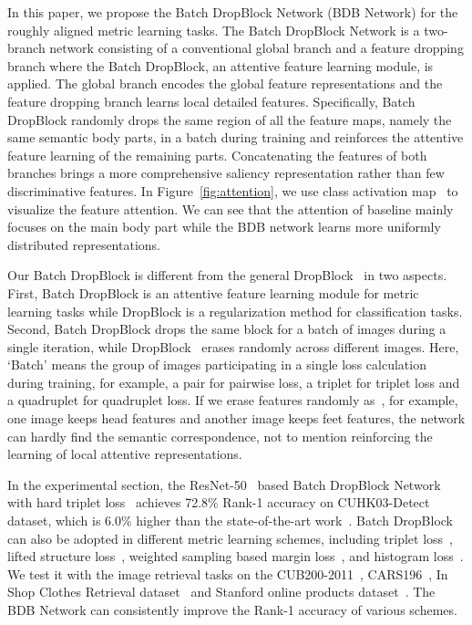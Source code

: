 \documentclass[10pt,twocolumn,letterpaper]{article}
\begin{document}
In this paper, we propose the Batch DropBlock Network (BDB Network) for the roughly aligned metric learning tasks. 
The Batch DropBlock Network is a two-branch network \textcolor{myRed}{consisting} of a conventional global branch and a feature dropping branch where the Batch DropBlock, an attentive feature learning module, is applied. The global branch encodes the global feature representations and the feature dropping branch learns local detailed features.
Specifically, Batch DropBlock randomly drops the same region of all the feature maps, namely the same semantic body parts, in a batch during training and reinforces the attentive feature learning of the \textcolor{myRed}{remaining} parts.
Concatenating the features of both branches brings a more comprehensive saliency representation rather than few discriminative features.
In Figure~\ref{fig:attention}, we use class activation map~\cite{zhou2016learning} to visualize the feature attention. We can see that the attention of baseline mainly focuses on the main body part while the BDB network learns more uniformly distributed representations.

Our Batch DropBlock is different from the general DropBlock~\cite{ghiasi2018dropblock} in two aspects.
First, Batch DropBlock is an attentive feature learning module for metric learning tasks while DropBlock is a regularization method for classification tasks.
Second, Batch DropBlock drops the same block for a batch of images during a single iteration, while DropBlock~\cite{ghiasi2018dropblock} erases randomly across different images. 
Here, `Batch' means the group of images participating in a single loss calculation during training, for example, a pair for pairwise loss, a triplet for triplet loss and a quadruplet for quadruplet loss.
If we erase features randomly as~\cite{ghiasi2018dropblock}, for example, one image keeps head features and another image keeps feet features, the network can hardly find the semantic correspondence, not to mention reinforcing the learning of local attentive representations.


In the experimental section, the ResNet-50~\cite{he2016resnet} based Batch DropBlock Network with hard triplet loss~\cite{hermans2017defense} achieves 72.8\% Rank-1 accuracy on CUHK03-Detect dataset, which is 6.0\% higher than the state-of-the-art work~\cite{wang2018mgn}.
Batch DropBlock can also be adopted in different metric learning schemes, including triplet loss~\cite{schroff2015facenet,hermans2017defense}, lifted structure loss~\cite{oh2016deep}, weighted sampling based margin loss~\cite{wu2017sampling}, and histogram loss~\cite{ustinova2016histogram}. We test it with the image retrieval tasks on the CUB200-2011~\cite{wah2011caltech}, CARS196~\cite{krause20133d}, In Shop Clothes Retrieval dataset~\cite{liu2016deepfashion} and Stanford online products dataset~\cite{song2017deep}. The BDB Network can consistently improve the Rank-1 accuracy of various schemes. 
\setlength{\textfloatsep}{1pt}
\end{document}
